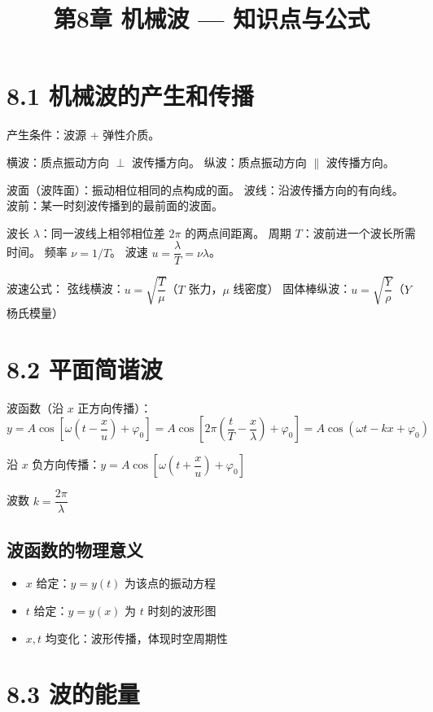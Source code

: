\documentclass{ctexart}
\title{\textbf{第8章 机械波} --- 知识点与公式}
\author{}
\date{}
\begin{document}
\maketitle

\section*{8.1 机械波的产生和传播}

产生条件：波源 + 弹性介质。

横波：质点振动方向 $\perp$ 波传播方向。
纵波：质点振动方向 $\parallel$ 波传播方向。

波面（波阵面）：振动相位相同的点构成的面。
波线：沿波传播方向的有向线。
波前：某一时刻波传播到的最前面的波面。

波长 $\lambda$：同一波线上相邻相位差 $2\pi$ 的两点间距离。
周期 $T$：波前进一个波长所需时间。
频率 $\nu = 1/T$。
波速 $u = \dfrac{\lambda}{T} = \nu\lambda$。

波速公式：
弦线横波：$u = \sqrt{\dfrac{T}{\mu}}$（$T$ 张力，$\mu$ 线密度）
固体棒纵波：$u = \sqrt{\dfrac{Y}{\rho}}$（$Y$ 杨氏模量）

\section*{8.2 平面简谐波}

波函数（沿 $x$ 正方向传播）：
\[
y = A\cos\left[\omega\left(t - \frac{x}{u}\right) + \varphi_0\right]
= A\cos\left[2\pi\left(\frac{t}{T} - \frac{x}{\lambda}\right) + \varphi_0\right]
= A\cos(\omega t - kx + \varphi_0)
\]

沿 $x$ 负方向传播：$y = A\cos\left[\omega\left(t + \dfrac{x}{u}\right) + \varphi_0\right]$

波数 $k = \dfrac{2\pi}{\lambda}$

\subsection*{波函数的物理意义}
\begin{itemize}
  \item $x$ 给定：$y = y(t)$ 为该点的振动方程
  \item $t$ 给定：$y = y(x)$ 为 $t$ 时刻的波形图
  \item $x, t$ 均变化：波形传播，体现时空周期性
\end{itemize}

\section*{8.3 波的能量}
\end{document}
